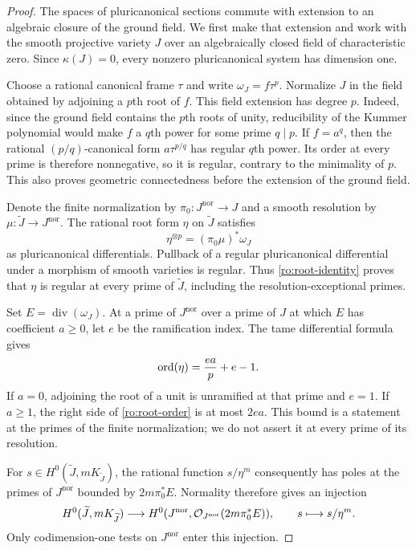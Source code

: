 \begin{proof}
The spaces of pluricanonical sections commute with extension to an
algebraic closure of the ground field.  We first make that extension and
work with the smooth projective variety $J$ over an algebraically closed
field of characteristic zero.  Since $\kappa(J)=0$, every nonzero
pluricanonical system has dimension one.

Choose a rational canonical frame $\tau$ and write
$\omega_J=f\tau^p$.  Normalize $J$ in the field obtained by adjoining a
$p$th root of $f$.  This field extension has degree $p$.  Indeed, since the
ground field contains the $p$th roots of unity, reducibility of the Kummer
polynomial would make $f$ a $q$th power for some prime $q\mid p$.  If
$f=a^q$, then the rational $(p/q)$-canonical form
$a\tau^{p/q}$ has regular $q$th power.  Its order at every prime is
therefore nonnegative, so it is regular, contrary to the minimality of
$p$.  This also proves geometric connectedness before the extension of
the ground field.

Denote the finite normalization by $\pi_0:J^{\mathrm{nor}}\to J$ and a
smooth resolution by $\mu:\widetilde J\to J^{\mathrm{nor}}$.  The rational
root form $\eta$ on $\widetilde J$ satisfies
\begin{equation}
 \eta^{\otimes p}=(\pi_0\mu)^*\omega_J
 \label{ro:root-identity}
\end{equation}
as pluricanonical differentials.  Pullback of a regular pluricanonical
differential under a morphism of smooth varieties is regular.  Thus
\eqref{ro:root-identity} proves that $\eta$ is regular at every prime of
$\widetilde J$, including the resolution-exceptional primes.

Set $E=\operatorname{div}(\omega_J)$.  At a prime of $J^{\mathrm{nor}}$
over a prime of $J$ at which $E$ has coefficient $a\ge0$, let $e$ be the
ramification index.  The tame differential formula gives
\begin{equation}
 \operatorname{ord}(\eta)=\frac{ea}{p}+e-1.
 \label{ro:root-order}
\end{equation}
If $a=0$, adjoining the root of a unit is unramified at that prime and
$e=1$.  If $a\ge1$, the right side of \eqref{ro:root-order} is at most
$2ea$.  This bound is a statement at the primes of the finite
normalization; we do not assert it at every prime of its resolution.

For $s\in H^0(\widetilde J,mK_{\widetilde J})$, the rational function
$s/\eta^m$ consequently has poles at the primes of $J^{\mathrm{nor}}$
bounded by $2m\pi_0^*E$.  Normality therefore gives an injection
\begin{equation}
 H^0(\widetilde J,mK_{\widetilde J})
 \longrightarrow
 H^0(J^{\mathrm{nor}},\mathcal O_{J^{\mathrm{nor}}}(2m\pi_0^*E)),
 \qquad s\longmapsto s/\eta^m.
 \label{ro:root-section-injection}
\end{equation}
Only codimension-one tests on $J^{\mathrm{nor}}$ enter this injection.


\end{proof}
